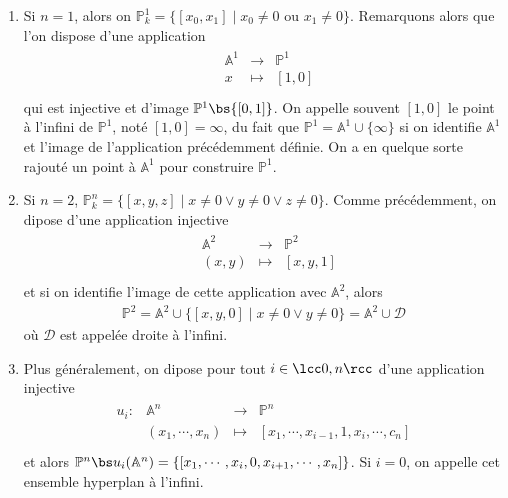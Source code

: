         \begin{expl}
            \begin{enumerate}
                \item Si $n = 1$, alors on $\mathbb{P}^1_k = \{[x_0, x_1] \mid x_0 \neq 0 \text{ ou } x_1 \neq 0\}$. Remarquons alors que l'on dispose d'une application
                \begin{align*}
                    \begin{array}{cccc}
                        & \mathbb{A}^1 & \to & \mathbb{P}^1 \\
                        & x & \mapsto & [1,0] \\
                    \end{array}
                \end{align*}
                qui est injective et d'image $\mathbb{P}^1 \bs \{[0,1]\}$. On appelle souvent $[1,0]$ le point à l'infini de $\mathbb{P}^1$, noté $[1,0] = \infty$, du fait que $\mathbb{P}^1 = \mathbb{A}^1 \cup \{\infty\}$ si on identifie $\mathbb{A}^1$ et l'image de l'application précédemment définie. On a en quelque sorte rajouté un point à $\mathbb{A}^1$ pour construire $\mathbb{P}^1$.
                \item Si $n = 2$, $\mathbb{P}^n_k = \{[x,y,z] \mid x \neq 0 \lor y \neq 0 \lor z \neq 0\}$. Comme précédemment, on dipose d'une application injective
                \begin{align*}
                    \begin{array}{cccc}
                        & \mathbb{A}^2 & \to & \mathbb{P}^2 \\
                        & (x,y) & \mapsto & [x, y, 1] \\
                    \end{array}	
                \end{align*}
                et si on identifie l'image de cette application avec $\mathbb{A}^2$, alors
                \begin{align*}
                    \mathbb{P}^2 = \mathbb{A}^2 \cup \{[x, y, 0] \mid x \neq 0 \lor y \neq 0\} = \mathbb{A}^2 \cup \mathcal{D}
                \end{align*}
                où $\mathcal{D}$ est appelée droite à l'infini.
                \item Plus généralement, on dipose pour tout $i \in \lcc 0, n \rcc$ d'une application injective
                \begin{align*}
                    \begin{array}{cccc}
                        u_i : & \mathbb{A}^n & \to & \mathbb{P}^n \\
                        & (x_1, \cdots, x_n) & \mapsto & [x_1, \cdots, x_{i-1}, 1, x_i, \cdots, c_n]\\
                    \end{array}
                \end{align*}
                et alors $\mathbb{P}^n \bs u_i(\mathbb{A}^n) = \{[x_1, \cdots, x_i, 0, x_{i+1}, \cdots, x_n]\}$. Si $i = 0$, on appelle cet ensemble hyperplan à l'infini.
            \end{enumerate}
        \end{expl}
